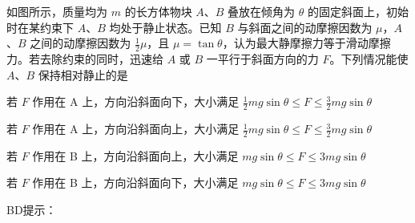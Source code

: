 如图所示，质量均为 $m$ 的长方体物块 \(A\)、\(B\) 叠放在倾角为 $\theta$ 的固定斜面上，初始时在某约束下 \(A\)、\(B\) 均处于静止状态。已知 \(B\) 与斜面之间的动摩擦因数为 $\mu$，\(A\)、\(B\) 之间的动摩擦因数为 $\frac{1}{2}\mu$，且 $\mu = \tan \theta$，认为最大静摩擦力等于滑动摩擦力。若去除约束的同时，迅速给 \(A\) 或 \(B\) 一平行于斜面方向的力 $F$。下列情况能使 \(A\)、\(B\) 保持相对静止的是\paren[]

\begin{choices}
	\item 若 $F$ 作用在 A 上，方向沿斜面向下，大小满足 $\frac{1}{2}mg\sin \theta \leq F \leq \frac{3}{2}mg\sin \theta$
	\item 若 $F$ 作用在 A 上，方向沿斜面向上，大小满足 $\frac{1}{2}mg\sin \theta \leq F \leq \frac{3}{2}mg\sin \theta$
	\item 若 $F$ 作用在 B 上，方向沿斜面向上，大小满足 $mg\sin \theta \leq F \leq 3mg\sin \theta$
	\item 若 $F$ 作用在 B 上，方向沿斜面向下，大小满足 $mg\sin \theta \leq F \leq 3mg\sin \theta$
\end{choices}
\begin{answer}
	BD\qquad 提示：
\end{answer}